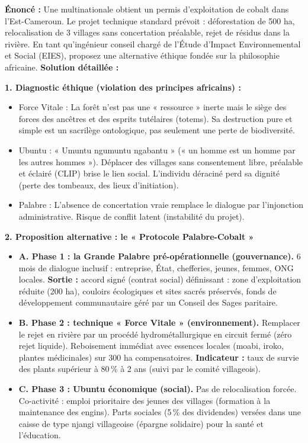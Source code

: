 \documentclass[11pt]{article}
\newcommand{\cle}[1]{{\popxbold\color{popdark}#1}}
\begin{document}
\begin{exoresolu}
\textbf{Énoncé :} Une multinationale obtient un permis d'exploitation de cobalt dans l'Est-Cameroun. Le projet technique standard prévoit : déforestation de 500 ha, relocalisation de 3 villages sans concertation préalable, rejet de résidus dans la rivière. En tant qu'ingénieur conseil chargé de l'Étude d'Impact Environnemental et Social (EIES), proposez une alternative éthique fondée sur la philosophie africaine.
\tcblower
\textbf{Solution détaillée :}

\textbf{1. Diagnostic éthique (violation des principes africains) :}
\begin{itemize}
    \item \cle{Force Vitale} : La forêt n'est pas une « ressource » inerte mais le siège des forces des ancêtres et des esprits tutélaires (totems). Sa destruction pure et simple est un \cle{sacrilège ontologique}, pas seulement une perte de biodiversité.
    \item \cle{Ubuntu} : « Umuntu ngumuntu ngabantu » (« un homme est un homme par les autres hommes »). Déplacer des villages sans \cle{consentement libre, préalable et éclairé (CLIP)} brise le lien social. L'individu déraciné perd sa dignité (perte des tombeaux, des lieux d'initiation).
    \item \cle{Palabre} : L'absence de concertation vraie remplace le dialogue par l'injonction administrative. Risque de conflit latent (instabilité du projet).
\end{itemize}

\textbf{2. Proposition alternative : le « Protocole Palabre-Cobalt »}
\begin{itemize}
    \item \textbf{A. Phase 1 : la Grande Palabre pré-opérationnelle (gouvernance).} 6 mois de dialogue inclusif : entreprise, État, chefferies, jeunes, femmes, ONG locales. \textbf{Sortie :} accord signé (contrat social) définissant : zone d'exploitation réduite (200 ha), couloirs écologiques et sites sacrés préservés, fonds de développement communautaire géré par un \cle{Conseil des Sages} paritaire.
    \item \textbf{B. Phase 2 : technique « Force Vitale » (environnement).} Remplacer le rejet en rivière par un \cle{procédé hydrométallurgique en circuit fermé} (zéro rejet liquide). Reboisement immédiat avec essences locales (moabi, iroko, plantes médicinales) sur 300 ha compensatoires. \textbf{Indicateur :} taux de survie des plants supérieur à 80\,\% à 2 ans (suivi par le comité villageois).
    \item \textbf{C. Phase 3 : Ubuntu économique (social).} Pas de relocalisation forcée. \cle{Co-activité} : emploi prioritaire des jeunes des villages (formation à la maintenance des engins). Parts sociales (5\,\% des dividendes) versées dans une caisse de type \cle{njangi} villageoise (épargne solidaire) pour la santé et l'éducation.
\end{itemize}


\end{exoresolu}
\end{document}
